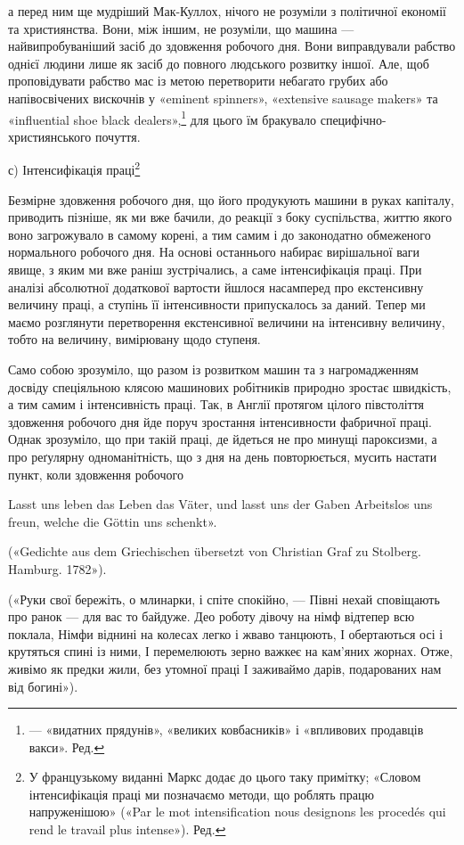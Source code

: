 а перед ним ще мудріший Мак-Куллох, нічого не розуміли з
політичної економії та християнства. Вони, між іншим, не розуміли,
що машина — найвипробуваніший засіб до здовження робочого
дня. Вони виправдували рабство однієї людини лише як
засіб до повного людського розвитку іншої. Але, щоб проповідувати
рабство мас із метою перетворити небагато грубих або
напівосвічених вискочнів у «eminent spinners», «extensive sausage
makers» та «influential shoe black dealers»,\footnote*{
— «видатних прядунів», «великих ковбасників» і «впливових
продавців вакси». Ред.
} для цього їм
бракувало специфічно-християнського почуття.

с) Інтенсифікація праці\footnote*{
У французькому виданні Маркс додає до цього таку примітку;
«Словом інтенсифікація праці ми позначаємо методи, що роблять працю
напруженішою» («Par le mot intensification nous designons les procedés
qui rend le travail plus intense»). Ред.
}

Безмірне здовження робочого дня, що його продукують машини
в руках капіталу, приводить пізніше, як ми вже бачили, до
реакції з боку суспільства, життю якого воно загрожувало в
самому корені, а тим самим і до законодатно обмеженого нормального
робочого дня. На основі останнього набирає вирішальної
ваги явище, з яким ми вже раніш зустрічались, а саме інтенсифікація
праці. При аналізі абсолютної додаткової вартости йшлося
насамперед про екстенсивну величину праці, а ступінь її інтенсивности
припускалось за даний. Тепер ми маємо розглянути
перетворення екстенсивної величини на інтенсивну величину,
тобто на величину, вимірювану щодо ступеня.

Само собою зрозуміло, що разом із розвитком машин та з нагромадженням
досвіду спеціяльною клясою машинових робітників
природно зростає швидкість, а тим самим і інтенсивність
праці. Так, в Англії протягом цілого півстоліття здовження
робочого дня йде поруч зростання інтенсивности фабричної праці.
Однак зрозуміло, що при такій праці, де йдеться не про минущі
пароксизми, а про реґулярну одноманітність, що з дня на день
повторюється, мусить настати пункт, коли здовження робочого

Lasst uns leben das Leben das Väter, und lasst uns der Gaben
Arbeitslos uns freun, welche die Göttin uns schenkt».

(«Gedichte aus dem Griechischen übersetzt von
Christian Graf zu Stolberg. Hamburg. 1782»).

(«Руки свої бережіть, о млинарки, і спіте спокійно, —
Півні нехай сповіщають про ранок — для вас то байдуже.
Део роботу дівочу на німф відтепер всю поклала,
Німфи віднині на колесах легко і жваво танцюють,
І обертаються осі і крутяться спині із ними,
І перемелюють зерно важкеє на кам'яних жорнах.
Отже, живімо як предки жили, без утомної праці
І заживаймо дарів, подарованих нам від богині»).